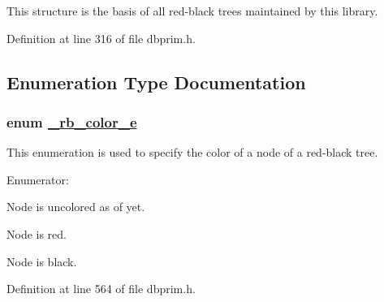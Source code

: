 This structure is the basis of all red-black trees maintained by this library.

Definition at line 316 of file dbprim.h.

\subsection{Enumeration Type Documentation}
\hypertarget{group__dbprim__rbtree_ga52}{
\subsubsection[\_\-rb\_\-color\_\-e]{\setlength{\rightskip}{0pt plus 5cm}enum \hyperlink{group__dbprim__rbtree_ga52}{\_\-rb\_\-color\_\-e}}}
\label{group__dbprim__rbtree_ga52}


This enumeration is used to specify the color of a node of a red-black tree.\begin{Desc}
\item[Enumerator: ]\par
\begin{description}
\item[{\em 
\hypertarget{group__dbprim__rbtree_gga52a139}{
RB\_\-COLOR\_\-NONE}
\label{group__dbprim__rbtree_gga52a139}
}]Node is uncolored as of yet. \item[{\em 
\hypertarget{group__dbprim__rbtree_gga52a140}{
RB\_\-COLOR\_\-RED}
\label{group__dbprim__rbtree_gga52a140}
}]Node is red. \item[{\em 
\hypertarget{group__dbprim__rbtree_gga52a141}{
RB\_\-COLOR\_\-BLACK}
\label{group__dbprim__rbtree_gga52a141}
}]Node is black. \end{description}
\end{Desc}



Definition at line 564 of file dbprim.h.

